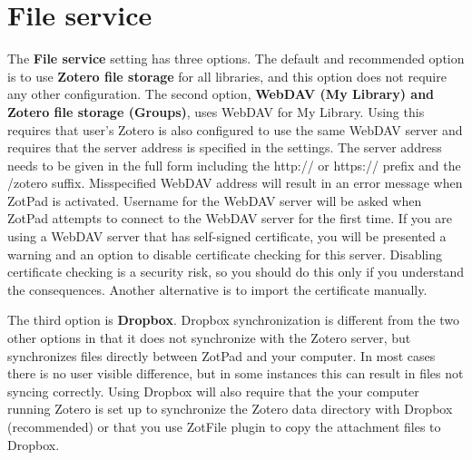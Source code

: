 \documentclass[oneside, openany, 12pt]{tufte-book}
\newcommand{\ipadfootnote}[1]{}
\newcommand{\ipadfootnote}[1]{\footnote{#1}}
\begin{document}
\section{File service}

The \textbf{File service} setting has three options. The default and recommended option is to use \textbf{Zotero file storage} for all libraries, and this option does not require any other configuration. The second option, \textbf{WebDAV (My Library) and Zotero file storage (Groups)}, uses WebDAV for My Library. Using this requires that user's Zotero is also configured to use the same WebDAV server and requires that the server address is specified in the settings. The server address needs to be given in the full form including the http:// or https:// prefix and the /zotero suffix. Misspecified WebDAV address will result in an error message when ZotPad is activated. Username for the WebDAV server will be asked when ZotPad attempts to connect to the WebDAV server for the first time. If you are using a WebDAV server that has self-signed certificate, you will be presented a warning and an option to disable certificate checking for this server. Disabling certificate checking is a security risk, so you should do this only if you understand the consequences. Another alternative is to import the certificate manually\ipadfootnote{See this page for instructions on how to install SSL certificates on iPad \url{http://stackoverflow.com/questions/4589562/how-to-install-my-servers-self-signed-certificate-on-an-ipad}}.

The third option is \textbf{Dropbox}. Dropbox synchronization is different from the two other options in that it does not synchronize with the Zotero server, but synchronizes files directly between ZotPad and your computer. In most cases there is no user visible difference, but in some instances this can result in files not syncing correctly\ipadfootnote{For example, if a you edit a file on your computer, but do not sync Zotero, ZotPad does not know that a new version of a file would be available in Dropbox because Zotero server is not aware of this change.}. Using Dropbox will also require that the your computer running Zotero is set up to synchronize the Zotero data directory with Dropbox (recommended) or that you use ZotFile plugin\ipadfootnote{More information about ZotFile can be found on the ZotFile website at \url{http://www.columbia.edu/~jpl2136/zotfile.html ZotPad supports all the ZotFile renaming features except collections based renaming.}} to copy the attachment files to Dropbox.
\end{document}

